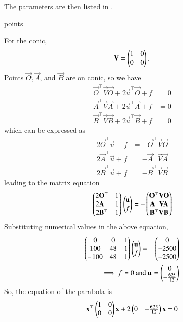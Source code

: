 The parameters are then listed in  
    .
\begin{table}[ht!]
	\centering
    
    \caption{points}
    \label{tab:chapters/11/11/5/3/points}
\end{table}
For the conic,
\begin{align}
    \mathbf{V} = \begin{pmatrix}1&0\\0&0\end{pmatrix}.
\end{align}
Points $\vec{O}, \vec{A}$, and $\vec{B}$ are on conic, so we have
\begin{align}
	\vec{O}^{\top}\vec{V}\vec{O} + 2\vec{u}^{\top}\vec{O} + f &= 0\\
	\vec{A}^{\top}\vec{V}\vec{A} + 2\vec{u}^{\top}\vec{A} + f &= 0\\
	\vec{B}^{\top}\vec{V}\vec{B} + 2\vec{u}^{\top}\vec{B} + f &= 0	 
\end{align}
which can be expressed as
\begin{align}
	2\vec{O}^{\top}\vec{u} + f &= - \vec{O}^{\top}\vec{V}\vec{O}\\
	2\vec{A}^{\top}\vec{u} + f &= - \vec{A}^{\top}\vec{V}\vec{A}\\
	2\vec{B}^{\top}\vec{u} + f &= - \vec{B}^{\top}\vec{V}\vec{B}	
\end{align}
leading to the matrix equation
\begin{align}
	\begin{pmatrix}2\mathbf{O}^{\top} & 1\\ 2\mathbf{A}^{\top} & 1\\ 2\mathbf{B}^{\top} & 1\end{pmatrix}\begin{pmatrix}\mathbf{u} \\ f\end{pmatrix} = -\begin{pmatrix}\mathbf{O}^{\top}\mathbf{V}\mathbf{O}\\ \mathbf{A}^{\top}\mathbf{V}\mathbf{A}\\ \mathbf{B}^{\top}\mathbf{V}\mathbf{B}\end{pmatrix}
\end{align}
Substituting numerical values in the above equation,
\begin{align}
    \begin{pmatrix}0&0&1\\ 100&48&1\\ -100&48&1\end{pmatrix}\begin{pmatrix}\mathbf{u} \\ f\end{pmatrix} = -\begin{pmatrix}0\\-2500\\-2500\end{pmatrix}\\
    \implies f = 0 \text{ and } \mathbf{u} = \begin{pmatrix}0\\-\frac{625}{12}\end{pmatrix}
\end{align}
So, the equation of the parabola is
\begin{align}
    \label{eq:chapters/11/11/5/3/parab1}  \mathbf{x}^{\top}\begin{pmatrix}1&0\\0&0\end{pmatrix}\mathbf{x} + 2\begin{pmatrix}0&-\frac{625}{12}\end{pmatrix}\mathbf{x} = 0 
\end{align}
